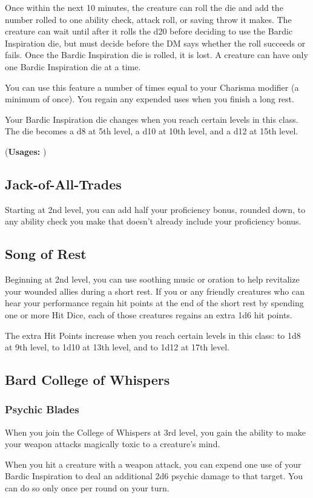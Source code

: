 \documentclass[letterpaper,openany,oneside,twocolumn]{book}
\begin{document}
Once within the next 10 minutes, the creature can roll the die and add the number rolled to one ability check, attack roll, or saving throw it makes. The creature can wait until after it rolls the d20 before deciding to use the Bardic Inspiration die, but must decide before the DM says whether the roll succeeds or fails. Once the Bardic Inspiration die is rolled, it is lost. A creature can have only one Bardic Inspiration die at a time.

You can use this feature a number of times equal to your Charisma modifier (a minimum of once). You regain any expended uses when you finish a long rest.

Your Bardic Inspiration die changes when you reach certain levels in this class. The die becomes a d8 at 5th level, a d10 at 10th level, and a d12 at 15th level.

(\textbf{Usages: })
\subsection*{Jack-of-All-Trades}
Starting at 2nd level, you can add half your proficiency bonus, rounded down, to any ability check you make that doesn't already include your proficiency bonus.
\subsection*{Song of Rest}
Beginning at 2nd level, you can use soothing music or oration to help revitalize your wounded allies during a short rest. If you or any friendly creatures who can hear your performance regain hit points at the end of the short rest by spending one or more Hit Dice, each of those creatures regains an extra 1d6 hit points.

The extra Hit Points increase when you reach certain levels in this class: to 1d8 at 9th level, to 1d10 at 13th level, and to 1d12 at 17th level.
\subsection*{Bard College of Whispers}
\subsubsection*{Psychic Blades}
When you join the College of Whispers at 3rd level, you gain the ability to make your weapon attacks magically toxic to a creature's mind.

When you hit a creature with a weapon attack, you can expend one use of your Bardic Inspiration to deal an additional 2d6 psychic damage to that target. You can do so only once per round on your turn.
\end{document}
